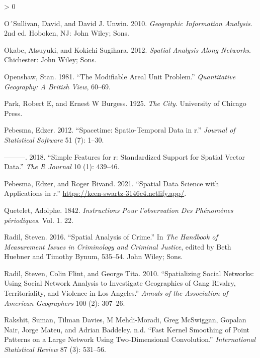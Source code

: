 \documentclass[
  krantz2]{krantz}
\newlength{\cslhangindent}
\newenvironment{CSLReferences}[2] %
 {%
  \setlength{\parindent}{0pt}
  \ifodd #1 \everypar{\setlength{\hangindent}{\cslhangindent}}\ignorespaces\fi
  \ifnum #2 > 0
  \setlength{\parskip}{#2\baselineskip}
  \fi
 }%
 {}
\begin{document}
\begin{CSLReferences}{1}{0}
\leavevmode\hypertarget{ref-OSullivan_2010}{}%
O´Sullivan, David, and David J. Unwin. 2010. \emph{Geographic Information Analysis}. 2nd ed. Hoboken, NJ: John Wiley; Sons.

\leavevmode\hypertarget{ref-Okabe_2012}{}%
Okabe, Atsuyuki, and Kokichi Sugihara. 2012. \emph{Spatial Analysis Along Networks}. Chichester: John Wiley; Sons.

\leavevmode\hypertarget{ref-Openshaw_1981}{}%
Openshaw, Stan. 1981. {``The Modifiable Areal Unit Problem.''} \emph{Quantitative Geography: A British View}, 60--69.

\leavevmode\hypertarget{ref-Park_1925}{}%
Park, Robert E, and Ernest W Burgess. 1925. \emph{The City}. University of Chicago Press.

\leavevmode\hypertarget{ref-Pebesma_2012}{}%
Pebesma, Edzer. 2012. {``Spacetime: Spatio-Temporal Data in r.''} \emph{Journal of Statistical Software} 51 (7): 1--30.

\leavevmode\hypertarget{ref-Pebesma_2018}{}%
---------. 2018. {``Simple Features for r: Standardized Support for Spatial Vector Data.''} \emph{The R Journal} 10 (1): 439--46.

\leavevmode\hypertarget{ref-Pebesma_2021}{}%
Pebesma, Edzer, and Roger Bivand. 2021. {``Spatial Data Science with Applications in r.''} \url{https://keen-swartz-3146c4.netlify.app/}.

\leavevmode\hypertarget{ref-Quetelet_1842}{}%
Quetelet, Adolphe. 1842. \emph{Instructions Pour l'observation Des Ph{é}nom{è}nes p{é}riodiques}. Vol. 1. 22.

\leavevmode\hypertarget{ref-Radil_2016}{}%
Radil, Steven. 2016. {``Spatial Analysis of Crime.''} In \emph{The Handbook of Measurement Issues in Criminology and Criminal Justice}, edited by Beth Huebner and Timothy Bynum, 535--54. John Wiley; Sons.

\leavevmode\hypertarget{ref-Radil_2010}{}%
Radil, Steven, Colin Flint, and George Tita. 2010. {``Spatializing Social Networks: Using Social Network Analysis to Investigate Geographies of Gang Rivalry, Territoriality, and Violence in Los Angeles.''} \emph{Annals of the Association of American Geographers} 100 (2): 307--26.

\leavevmode\hypertarget{ref-Rakshit_2019}{}%
Rakshit, Suman, Tilman Davies, M Mehdi-Moradi, Greg McSwiggan, Gopalan Nair, Jorge Mateu, and Adrian Baddeley. n.d. {``Fast Kernel Smoothing of Point Patterns on a Large Network Using Two-Dimensional Convolution.''} \emph{International Statistical Review} 87 (3): 531--56.


\end{CSLReferences}
\end{document}
